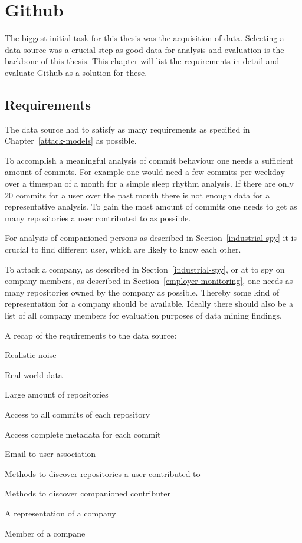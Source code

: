 \chapter{Github}\label{github}
The biggest initial task for this thesis was the acquisition of data.
Selecting a data source was a crucial step as good data for analysis and evaluation is the backbone of this thesis. This chapter will list the requirements in detail and evaluate Github as a solution for these.

\section{Requirements}
The data source had to satisfy as many requirements as specified in Chapter~\ref{attack-models} as possible.

To accomplish a meaningful analysis of commit behaviour one needs a sufficient amount of commits.
For example one would need a few commits per weekday over a timespan of a month for a simple sleep rhythm analysis.
If there are only 20 commits for a user over the past month there is not enough data for a representative analysis.
To gain the most amount of commits one needs to get as many repositories a user contributed to as possible.

For analysis of companioned persons as described in Section~\ref{industrial-spy} it is crucial to find different user, which are likely to know each other.

To attack a company, as described in Section~\ref{industrial-spy}, or at to spy on company members, as described in Section~\ref{employer-monitoring}, one needs as many repositories owned by the company as possible.
Thereby some kind of representation for a company should be available.
Ideally there should also be a list of all company members for evaluation purposes of data mining findings.

\begin{itemlist}{A recap of the requirements to the data source:}
    \item Realistic noise
    \item Real world data
    \item Large amount of repositories
    \item Access to all commits of each repository
    \item Access complete metadata for each commit
    \item Email to user association
    \item Methods to discover repositories a user contributed to
    \item Methods to discover companioned contributer
    \item A representation of a company
    \item Member of a compane
    \end{itemlist}


